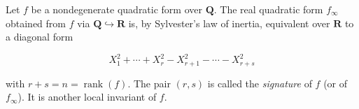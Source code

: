 Let $f$ be a nondegenerate quadratic form over $\mathbf{Q}$. The real quadratic form $f_\infty$ obtained from $f$ via $\mathbf{Q} \hookrightarrow \mathbf{R}$ is, by Sylvester's law of inertia, equivalent over $\mathbf{R}$ to a diagonal form

$$X_1^2 + \cdots + X_r^2 - X_{r+1}^2 - \cdots - X_{r+s}^2$$

with $r+s = n = \operatorname{rank}(f)$. The pair $(r, s)$ is called the \textit{signature} of $f$ (or of $f_\infty$). It is another local invariant of $f$.
